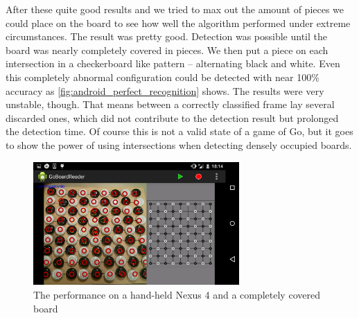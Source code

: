 	After these quite good results and we tried to max out the amount of pieces we could place on the board to see how well the algorithm performed under extreme circumstances. The result was pretty good. Detection was possible until the board was nearly completely covered in pieces. We then put a piece on each intersection in a checkerboard like pattern -- alternating black and white. Even this completely abnormal configuration could be detected with near 100\% accuracy as \autoref{fig:android_perfect_recognition} shows. The results were very unstable, though. That means between a correctly classified frame lay several discarded ones, which did not contribute to the detection result but prolonged the detection time. Of course this is not a valid state of a game of Go, but it goes to show the power of using intersections when detecting densely occupied boards.

	\begin{figure}[h]
		\center
		\includegraphics[width=0.7\textwidth]{images/android_perfect_recognition.png}
		\caption{The performance on a hand-held Nexus 4 and a completely covered board}
		\label{fig:android_perfect_recognition}
	\end{figure}
